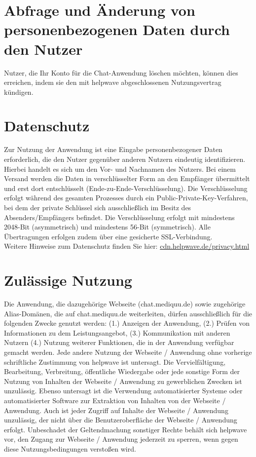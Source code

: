 \documentclass[10pt]{article}
\begin{document}
\section{Abfrage und Änderung von personenbezogenen Daten durch den Nutzer}
Nutzer, die Ihr Konto für die Chat-Anwendung löschen möchten, können dies erreichen, indem sie den mit helpwave abgeschlossenen Nutzungsvertrag kündigen.

\section{Datenschutz}
Zur Nutzung der Anwendung ist eine Eingabe personenbezogener Daten erforderlich, die den Nutzer gegenüber anderen
Nutzern eindeutig identifizieren. Hierbei handelt es sich um den Vor- und Nachnamen des Nutzers. Bei einem Versand werden die Daten in verschlüsselter Form an den Empfänger übermittelt und erst dort entschlüsselt (Ende-zu-Ende-Verschlüsselung). Die Verschlüsselung erfolgt während des gesamten Prozesses durch ein Public-Private-Key-Verfahren, bei dem der private Schlüssel sich ausschließlich im Besitz des Absenders/Empfängers befindet. Die Verschlüsselung erfolgt mit mindestens
2048-Bit (asymmetrisch) und mindestens 56-Bit (symmetrisch). Alle Übertragungen erfolgen zudem über eine gesicherte
SSL-Verbindung. \\

Weitere Hinweise zum Datenschutz finden Sie hier: \href{https://cdn.helpwave.de/privacy.html}{cdn.helpwave.de/privacy.html}

\section{Zulässige Nutzung}
Die Anwendung, die dazugehörige Webseite (chat.mediquu.de) sowie zugehörige Alias-Domänen, die auf chat.mediquu.de
weiterleiten, dürfen ausschließlich für die folgenden Zwecke genutzt werden: (1.) Anzeigen der Anwendung, (2.) Prüfen von
Informationen zu dem Leistungsangebot, (3.) Kommunikation mit anderen Nutzern (4.) Nutzung weiterer Funktionen, die
in der Anwendung verfügbar gemacht werden. Jede andere Nutzung der Webseite / Anwendung ohne vorherige schriftliche Zustimmung von helpwave ist untersagt. Die Vervielfältigung, Bearbeitung, Verbreitung, öffentliche Wiedergabe oder
jede sonstige Form der Nutzung von Inhalten der Webseite / Anwendung zu gewerblichen Zwecken ist unzulässig. Ebenso
untersagt ist die Verwendung automatisierter Systeme oder automatisierter Software zur Extraktion von Inhalten von der
Webseite / Anwendung. Auch ist jeder Zugriff auf Inhalte der Webseite / Anwendung unzulässig, der nicht über die Benutzeroberfläche der Webseite / Anwendung erfolgt.
Unbeschadet der Geltendmachung sonstiger Rechte behält sich helpwave vor, den Zugang zur Webseite / Anwendung jederzeit zu sperren, wenn gegen diese Nutzungsbedingungen verstoßen wird.
\end{document}
